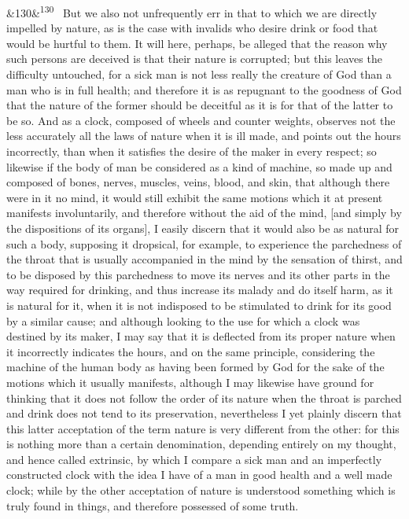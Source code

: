 \documentclass[12pt]{article}
\newcommand{\para}[1][]{\par\noindent\ifx&#1&\else\textsuperscript{\footnotesize #1}~\fi}
\begin{document}
\para[130] But we also not unfrequently err in that to which we are directly impelled by nature, as is the case with invalids who desire drink or food that would be hurtful to them. It will here, perhaps, be alleged that the reason why such persons are deceived is that their nature is corrupted; but this leaves the difficulty untouched, for a sick man is not less really the creature of God than a man who is in full health; and therefore it is as repugnant to the goodness of God that the nature of the former should be deceitful as it is for that of the latter to be so. And as a clock, composed of wheels and counter weights, observes not the less accurately all the laws of nature when it is ill made, and points out the hours incorrectly, than when it satisfies the desire of the maker in every respect; so likewise if the body of man be considered as a kind of machine, so made up and composed of bones, nerves, muscles, veins, blood, and skin, that although there were in it no mind, it would still exhibit the same motions which it at present manifests involuntarily, and therefore without the aid of the mind, [and simply by the dispositions of its organs], I easily discern that it would also be as natural for such a body, supposing it dropsical, for example, to experience the parchedness of the throat that is usually accompanied in the mind by the sensation of thirst, and to be disposed by this parchedness to move its nerves and its other parts in the way required for drinking, and thus increase its malady and do itself harm, as it is natural for it, when it is not indisposed to be stimulated to drink for its good by a similar cause; and although looking to the use for which a clock was destined by its maker, I may say that it is deflected from its proper nature when it incorrectly indicates the hours, and on the same principle, considering the machine of the human body as having been formed by God for the sake of the motions which it usually manifests, although I may likewise have ground for thinking that it does not follow the order of its nature when the throat is parched and drink does not tend to its preservation, nevertheless I yet plainly discern that this latter acceptation of the term nature is very different from the other: for this is nothing more than a certain denomination, depending entirely on my thought, and hence called extrinsic, by which I compare a sick man and an imperfectly constructed clock with the idea I have of a man in good health and a well made clock; while by the other acceptation of nature is understood something which is truly found in things, and therefore possessed of some truth.
\end{document}
